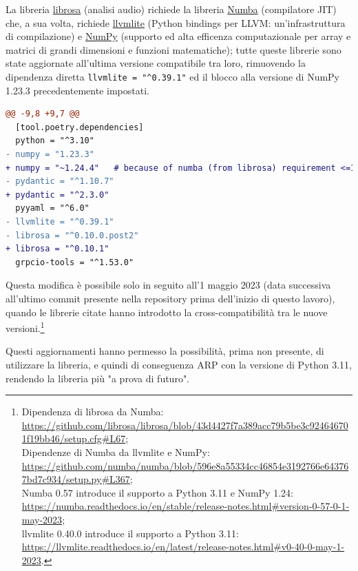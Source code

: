 La libreria \href{https://librosa.org/}{librosa} (analisi audio) richiede la libreria \href{https://numba.pydata.org/}{Numba} (compilatore JIT) che, a sua volta, richiede \href{https://llvmlite.readthedocs.io/en/latest/}{llvmlite} (Python bindings per LLVM: un'infrastruttura di compilazione) e \href{https://numpy.org/}{NumPy} (supporto ed alta efficenza computazionale per array e matrici di grandi dimensioni e funzioni matematiche); tutte queste librerie sono state aggiornate all'ultima versione compatibile tra loro, rimuovendo la dipendenza diretta \verb|llvmlite = "^0.39.1"| ed il blocco alla versione di NumPy 1.23.3 precedentemente impostati.
\begin{lstlisting}[language=diff, caption={\texttt{pyproject.toml}, aggiornamento delle dipendenze}]
@@ -9,8 +9,7 @@
  [tool.poetry.dependencies]
  python = "^3.10"
- numpy = "1.23.3"
+ numpy = "~1.24.4"   # because of numba (from librosa) requirement <=1.24
- pydantic = "^1.10.7"
+ pydantic = "^2.3.0"
  pyyaml = "^6.0"
- llvmlite = "^0.39.1" 
- librosa = "^0.10.0.post2"
+ librosa = "^0.10.1"
  grpcio-tools = "^1.53.0"
\end{lstlisting}
Questa modifica è possibile solo in seguito all'1 maggio 2023 (data successiva all'ultimo commit presente nella repository prima dell'inizio di questo lavoro), quando le librerie citate hanno introdotto la cross-compatibilità tra le nuove versioni.\footnote{Dipendenza di librosa da Numba: \url{https://github.com/librosa/librosa/blob/43d4427f7a389acc79b5be3c924646701f19bb46/setup.cfg\#L67};\\
Dipendenze di Numba da llvmlite e NumPy: \url{https://github.com/numba/numba/blob/596e8a55334cc46854e3192766e643767bd7c934/setup.py\#L367};\\
Numba 0.57 introduce il supporto a Python 3.11 e NumPy 1.24: \url{https://numba.readthedocs.io/en/stable/release-notes.html\#version-0-57-0-1-may-2023};\\
llvmlite 0.40.0 introduce il supporto a Python 3.11: \url{https://llvmlite.readthedocs.io/en/latest/release-notes.html\#v0-40-0-may-1-2023}.}

Questi aggiornamenti hanno permesso la possibilità, prima non presente, di utilizzare la libreria, e quindi di conseguenza \ac{ARP} con la versione di Python 3.11, rendendo la libreria più "a prova di futuro".
